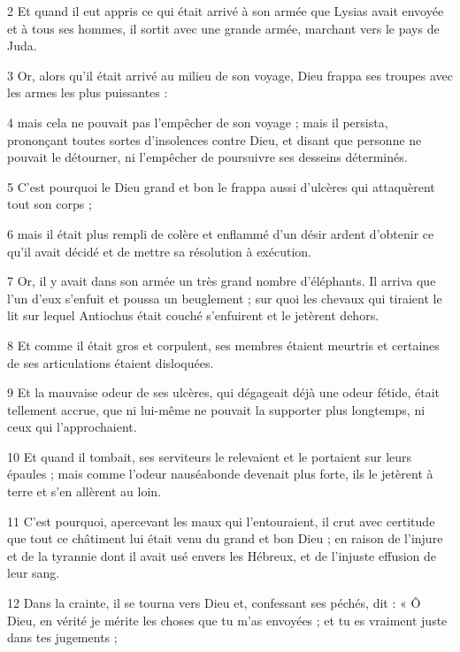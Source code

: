 \par 2 Et quand il eut appris ce qui était arrivé à son armée que Lysias avait envoyée et à tous ses hommes, il sortit avec une grande armée, marchant vers le pays de Juda.

\par 3 Or, alors qu'il était arrivé au milieu de son voyage, Dieu frappa ses troupes avec les armes les plus puissantes :

\par 4 mais cela ne pouvait pas l'empêcher de son voyage ; mais il persista, prononçant toutes sortes d'insolences contre Dieu, et disant que personne ne pouvait le détourner, ni l'empêcher de poursuivre ses desseins déterminés.

\par 5 C'est pourquoi le Dieu grand et bon le frappa aussi d'ulcères qui attaquèrent tout son corps ;

\par 6 mais il était plus rempli de colère et enflammé d'un désir ardent d'obtenir ce qu'il avait décidé et de mettre sa résolution à exécution.

\par 7 Or, il y avait dans son armée un très grand nombre d'éléphants. Il arriva que l'un d'eux s'enfuit et poussa un beuglement ; sur quoi les chevaux qui tiraient le lit sur lequel Antiochus était couché s'enfuirent et le jetèrent dehors.

\par 8 Et comme il était gros et corpulent, ses membres étaient meurtris et certaines de ses articulations étaient disloquées.

\par 9 Et la mauvaise odeur de ses ulcères, qui dégageait déjà une odeur fétide, était tellement accrue, que ni lui-même ne pouvait la supporter plus longtemps, ni ceux qui l'approchaient.

\par 10 Et quand il tombait, ses serviteurs le relevaient et le portaient sur leurs épaules ; mais comme l'odeur nauséabonde devenait plus forte, ils le jetèrent à terre et s'en allèrent au loin.

\par 11 C'est pourquoi, apercevant les maux qui l'entouraient, il crut avec certitude que tout ce châtiment lui était venu du grand et bon Dieu ; en raison de l'injure et de la tyrannie dont il avait usé envers les Hébreux, et de l'injuste effusion de leur sang.

\par 12 Dans la crainte, il se tourna vers Dieu et, confessant ses péchés, dit : « Ô Dieu, en vérité je mérite les choses que tu m’as envoyées ; et tu es vraiment juste dans tes jugements ;

